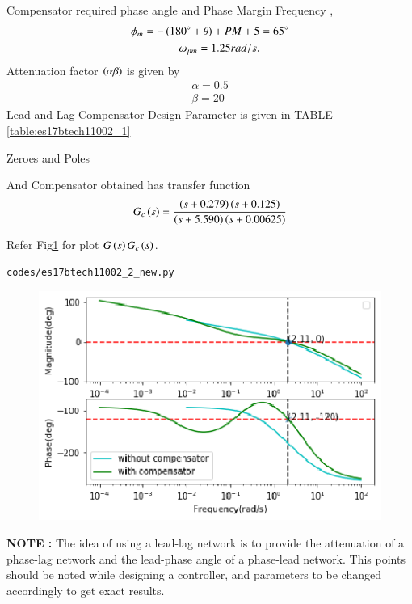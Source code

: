 Compensator required phase angle  and  Phase Margin Frequency , 
\begin{align}
    \phi_{m}= -\left(180\degree+\theta\right)+PM+5 & =65\degree
    \\
    \omega_{pm}=1.25 rad/s.
\end{align}
Attenuation factor $\left(\alpha\beta\right)$ is given by
\begin{align}
\alpha= 0.5
\\
\beta =  20
\end{align}
Lead and Lag Compensator Design Parameter is given in TABLE \ref{table:es17btech11002_1}
\begin{table}[!ht]
\centering

\caption{Zeroes and Poles}
\label{table:es17btech11002_1}
\end{table}
And Compensator obtained has transfer function
\begin{align}
    G_{c}\left(s\right)= \frac{\left(s+0.279\right)\left(s+0.125\right)}{\left(s+5.590\right)\left(s+0.00625\right)}
\end{align}

Refer Fig\ref{fig:es17btech11002_2} for plot $G\left(s\right)G_{c}\left(s\right)$.
\begin{lstlisting}
codes/es17btech11002_2_new.py
\end{lstlisting}
\begin{figure}[!h]
\centering
\includegraphics[width=\columnwidth]{./figs/es17btech11002_2_new.eps}
\caption{}
\label{fig:es17btech11002_2}
\end{figure}

\textbf{NOTE :} The idea of using a lead-lag network is to provide the attenuation of a phase-lag network and the lead-phase angle of a phase-lead
network. This points should be noted while designing a controller, and parameters to be changed accordingly to get exact results.
